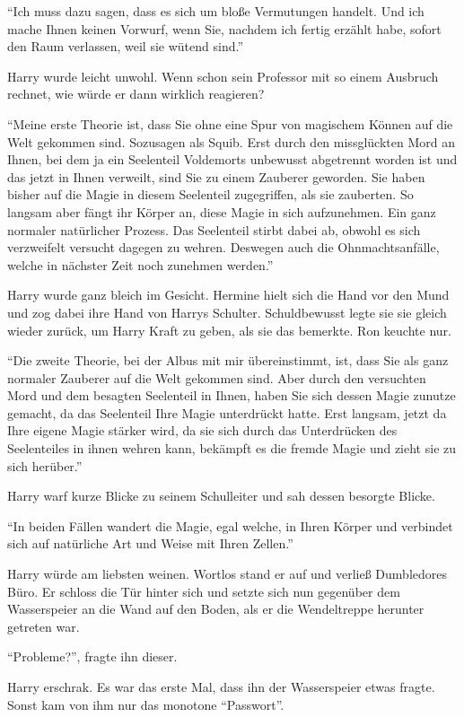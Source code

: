 \enquote{Ich muss dazu sagen, dass es sich um bloße Vermutungen handelt. Und ich mache Ihnen keinen Vorwurf, wenn Sie, nachdem ich fertig erzählt habe, sofort den Raum verlassen, weil sie wütend sind.}

Harry wurde leicht unwohl. Wenn schon sein Professor mit so einem Ausbruch rechnet, wie würde er dann wirklich reagieren?

\enquote{Meine erste Theorie ist, dass Sie ohne eine Spur von magischem Können auf die Welt gekommen sind. Sozusagen als Squib. Erst durch den missglückten Mord an Ihnen, bei dem ja ein Seelenteil Voldemorts unbewusst abgetrennt worden ist und das jetzt in Ihnen verweilt, sind Sie zu einem Zauberer geworden. Sie haben bisher auf die Magie in diesem Seelenteil zugegriffen, als sie zauberten. So langsam aber fängt ihr Körper an, diese Magie in sich aufzunehmen. Ein ganz normaler natürlicher Prozess. Das Seelenteil stirbt dabei ab, obwohl es sich verzweifelt versucht dagegen zu wehren. Deswegen auch die Ohnmachtsanfälle, welche in nächster Zeit noch zunehmen werden.}

Harry wurde ganz bleich im Gesicht. Hermine hielt sich die Hand vor den Mund und zog dabei ihre Hand von Harrys Schulter. Schuldbewusst legte sie sie gleich wieder zurück, um Harry Kraft zu geben, als sie das bemerkte. Ron keuchte nur.

\enquote{Die zweite Theorie, bei der Albus mit mir übereinstimmt, ist, dass Sie als ganz normaler Zauberer auf die Welt gekommen sind. Aber durch den versuchten Mord und dem besagten Seelenteil in Ihnen, haben Sie sich dessen Magie zunutze gemacht, da das Seelenteil Ihre Magie unterdrückt hatte. Erst langsam, jetzt da Ihre eigene Magie stärker wird, da sie sich durch das Unterdrücken des Seelenteiles in ihnen wehren kann, bekämpft es die fremde Magie und zieht sie zu sich herüber.}

Harry warf kurze Blicke zu seinem Schulleiter und sah dessen besorgte Blicke.

\enquote{In beiden Fällen wandert die Magie, egal welche, in Ihren Körper und verbindet sich auf natürliche Art und Weise mit Ihren Zellen.}

Harry würde am liebsten weinen. Wortlos stand er auf und verließ Dumbledores Büro. Er schloss die Tür hinter sich und setzte sich nun gegenüber dem Wasserspeier an die Wand auf den Boden, als er die Wendeltreppe herunter getreten war.

\enquote{Probleme?}, fragte ihn dieser.

Harry erschrak. Es war das erste Mal, dass ihn der Wasserspeier etwas fragte. Sonst kam von ihm nur das monotone \enquote{Passwort}.

